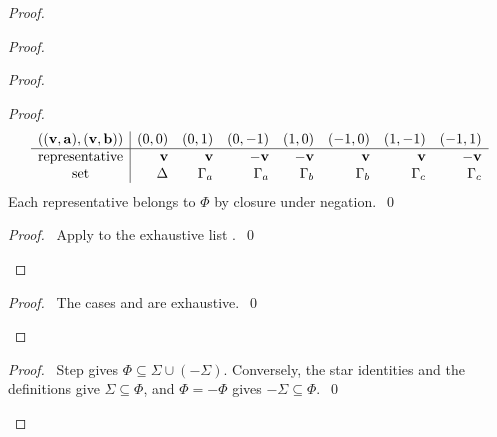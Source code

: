 \begin{proof}
\begin{proof}
\begin{proof}
\begin{proof}
\[\begin{array}{c|rrrrrrr}
    (({\mathbf v},{\mathbf a}),({\mathbf v},{\mathbf b}))&(0,0)&(0,1)&(0,-1)&(1,0)&(-1,0)&(1,-1)&(-1,1)\\\hline
    \text{representative}&{\mathbf v}&{\mathbf v}&-{\mathbf v}&-{\mathbf v}&{\mathbf v}&{\mathbf v}&-{\mathbf v}\\
    \text{set}&\Delta&\Gamma_a&\Gamma_a&\Gamma_b&\Gamma_b&\Gamma_c&\Gamma_c
    \end{array}
    \]
    Each representative belongs to $\Phi$ by closure under negation.~\qed
   \end{proof}
   \qedstep
   \begin{proof}\pf\ Apply  to the exhaustive list .~\qed\end{proof}
  \end{proof}
  \qedstep
  \begin{proof}\pf\ The cases  and  are exhaustive.~\qed\end{proof}
 \end{proof}
 \qedstep
 \begin{proof}
  \pf\ Step  gives $\Phi\subseteq\Sigma\cup(-\Sigma)$.
  Conversely, the star identities and the definitions give $\Sigma\subseteq\Phi$,
  and $\Phi=-\Phi$ gives $-\Sigma\subseteq\Phi$.~\qed
 \end{proof}
\end{proof}

